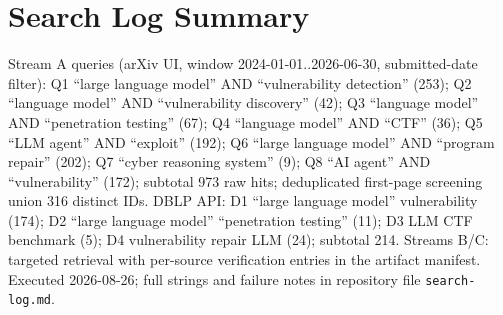 \documentclass[conference,compsoc]{IEEEtran}
\begin{document}
\vspace{6pt}
\section{Search Log Summary}
\label{app:search}
Stream A queries (arXiv UI, window 2024-01-01..2026-06-30, submitted-date filter):
Q1 ``large language model'' AND ``vulnerability detection'' (253); Q2 ``language model'' AND
``vulnerability discovery'' (42); Q3 ``language model'' AND ``penetration testing'' (67);
Q4 ``language model'' AND ``CTF'' (36); Q5 ``LLM agent'' AND ``exploit'' (192);
Q6 ``large language model'' AND ``program repair'' (202); Q7 ``cyber reasoning system'' (9);
Q8 ``AI agent'' AND ``vulnerability'' (172); subtotal 973 raw hits; deduplicated first-page
screening union 316 distinct IDs. DBLP API: D1 ``large language model'' vulnerability (174);
D2 ``large language model'' ``penetration testing'' (11); D3 LLM CTF benchmark (5);
D4 vulnerability repair LLM (24); subtotal 214. Streams B/C: targeted retrieval with per-source
verification entries in the artifact manifest. Executed 2026-08-26; full strings and failure
notes in repository file \texttt{search-log.md}.

\vspace{6pt}
\end{document}
